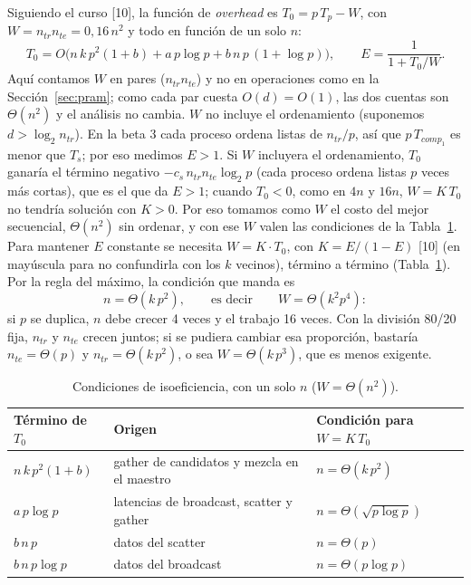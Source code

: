 \documentclass[11pt,a4paper]{article}
\newcommand{\ntr}{n_{tr}}
\newcommand{\nte}{n_{te}}
\begin{document}
Siguiendo el curso [10], la función de \textit{overhead} es $T_0 = p\,T_p - W$, con $W = \ntr\nte = 0{,}16\,n^2$ y todo en función de un solo $n$:
\[
T_0 = O\big(n\, k\, p^2 (1 + b) + a\,p\log p + b\,n\,p\,(1 + \log p)\big),
\qquad E = \frac{1}{1 + T_0/W}.
\]
Aquí contamos $W$ en pares ($\ntr\nte$) y no en operaciones como en la Sección~\ref{sec:pram}; como cada par cuesta $O(d) = O(1)$, las dos cuentas son $\Theta(n^2)$ y el análisis no cambia. $W$ no incluye el ordenamiento (suponemos $d > \log_2\ntr$). En la beta 3 cada proceso ordena listas de $\ntr/p$, así que $p\,T_{comp_1}$ es menor que $T_s$; por eso medimos $E > 1$. Si $W$ incluyera el ordenamiento, $T_0$ ganaría el término negativo $-c_s\,\ntr\nte\log_2 p$ (cada proceso ordena listas $p$ veces más cortas), que es el que da $E > 1$; cuando $T_0 < 0$, como en $4n$ y $16n$, $W = K\,T_0$ no tendría solución con $K > 0$. Por eso tomamos como $W$ el costo del mejor secuencial, $\Theta(n^2)$ sin ordenar, y con ese $W$ valen las condiciones de la Tabla~\ref{tab:iso}.
Para mantener $E$ constante se necesita $W = K\cdot T_0$, con $K = E/(1-E)$ [10] (en mayúscula para no confundirla con los $k$ vecinos), término a término (Tabla~\ref{tab:iso}). Por la regla del máximo, la condición que manda es
\[
n = \Theta(k\,p^2), \qquad\text{es decir}\qquad W = \Theta(k^2 p^4):
\]
si $p$ se duplica, $n$ debe crecer 4 veces y el trabajo 16 veces. Con la división 80/20 fija, $\ntr$ y $\nte$ crecen juntos; si se pudiera cambiar esa proporción, bastaría $\nte = \Theta(p)$ y $\ntr = \Theta(k\,p^2)$, o sea $W = \Theta(k\,p^3)$, que es menos exigente.

\begin{table}[!htb]
\centering
\small
\begin{tabular}{lll}
\toprule
\textbf{Término de $T_0$} & \textbf{Origen} & \textbf{Condición para $W = K\,T_0$} \\
\midrule
$n\,k\,p^2(1+b)$ & gather de candidatos y mezcla en el maestro & $n = \Theta(k\,p^2)$ \\
$a\,p\log p$ & latencias de broadcast, scatter y gather & $n = \Theta(\sqrt{p\log p})$ \\
$b\,n\,p$ & datos del scatter & $n = \Theta(p)$ \\
$b\,n\,p\log p$ & datos del broadcast & $n = \Theta(p\log p)$ \\
\bottomrule
\end{tabular}
\caption{Condiciones de isoeficiencia, con un solo $n$ ($W = \Theta(n^2)$).}
\label{tab:iso}
\end{table}
\end{document}
